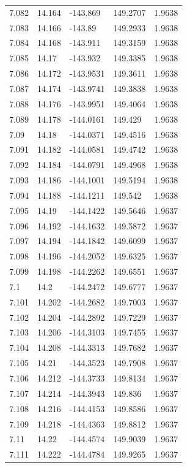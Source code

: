 \begin{tabular}{lllll}
7.082 & 14.164 & -143.869 & 149.2707 & 1.9638 \\
7.083 & 14.166 & -143.89 & 149.2933 & 1.9638 \\
7.084 & 14.168 & -143.911 & 149.3159 & 1.9638 \\
7.085 & 14.17 & -143.932 & 149.3385 & 1.9638 \\
7.086 & 14.172 & -143.9531 & 149.3611 & 1.9638 \\
7.087 & 14.174 & -143.9741 & 149.3838 & 1.9638 \\
7.088 & 14.176 & -143.9951 & 149.4064 & 1.9638 \\
7.089 & 14.178 & -144.0161 & 149.429 & 1.9638 \\
7.09 & 14.18 & -144.0371 & 149.4516 & 1.9638 \\
7.091 & 14.182 & -144.0581 & 149.4742 & 1.9638 \\
7.092 & 14.184 & -144.0791 & 149.4968 & 1.9638 \\
7.093 & 14.186 & -144.1001 & 149.5194 & 1.9638 \\
7.094 & 14.188 & -144.1211 & 149.542 & 1.9638 \\
7.095 & 14.19 & -144.1422 & 149.5646 & 1.9637 \\
7.096 & 14.192 & -144.1632 & 149.5872 & 1.9637 \\
7.097 & 14.194 & -144.1842 & 149.6099 & 1.9637 \\
7.098 & 14.196 & -144.2052 & 149.6325 & 1.9637 \\
7.099 & 14.198 & -144.2262 & 149.6551 & 1.9637 \\
7.1 & 14.2 & -144.2472 & 149.6777 & 1.9637 \\
7.101 & 14.202 & -144.2682 & 149.7003 & 1.9637 \\
7.102 & 14.204 & -144.2892 & 149.7229 & 1.9637 \\
7.103 & 14.206 & -144.3103 & 149.7455 & 1.9637 \\
7.104 & 14.208 & -144.3313 & 149.7682 & 1.9637 \\
7.105 & 14.21 & -144.3523 & 149.7908 & 1.9637 \\
7.106 & 14.212 & -144.3733 & 149.8134 & 1.9637 \\
7.107 & 14.214 & -144.3943 & 149.836 & 1.9637 \\
7.108 & 14.216 & -144.4153 & 149.8586 & 1.9637 \\
7.109 & 14.218 & -144.4363 & 149.8812 & 1.9637 \\
7.11 & 14.22 & -144.4574 & 149.9039 & 1.9637 \\
7.111 & 14.222 & -144.4784 & 149.9265 & 1.9637 \\

\end{tabular}

